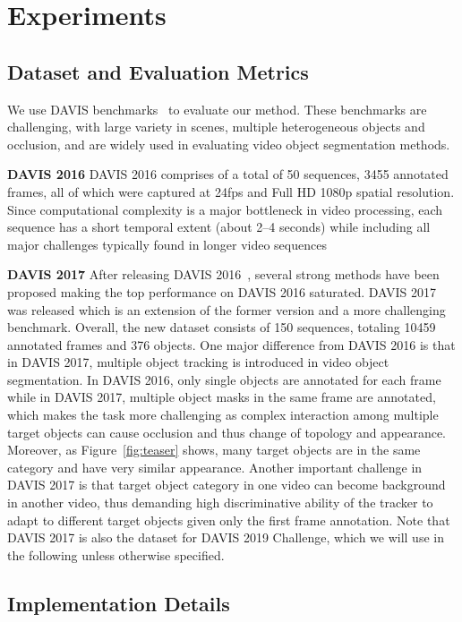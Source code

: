 \documentclass[10pt,twocolumn,letterpaper]{article}
\begin{document}
\section{Experiments}

\subsection{Dataset and Evaluation Metrics}
We use DAVIS benchmarks~\cite{perazzi2016davis, pont2017davis, caelles2018davis} to evaluate our method.
These benchmarks are challenging, with large variety in scenes, multiple heterogeneous objects and occlusion, and are
widely used in evaluating video object segmentation methods.

\textbf{DAVIS 2016}
DAVIS 2016 comprises of a total of 50 sequences, 3455 annotated frames, all of which were captured at 24fps and Full HD 1080p spatial resolution.
Since computational complexity is a major bottleneck in video processing, each sequence has a short temporal extent (about 2--4 seconds) while including all major challenges typically found in longer video sequences

\textbf{DAVIS 2017}
After releasing DAVIS 2016~\cite{perazzi2016davis}, several strong methods have been proposed making the top performance on DAVIS 2016 saturated.
DAVIS 2017 was released which is an extension of the former version and a more challenging benchmark.
Overall, the new dataset consists of 150 sequences, totaling 10459 annotated frames and 376 objects.
One major difference from DAVIS 2016 is that in DAVIS 2017, multiple object tracking is introduced in video object segmentation.
In DAVIS 2016, only single objects are annotated for each frame while
in DAVIS 2017, multiple object masks in the same frame are annotated,
which makes the task more challenging as complex interaction among multiple target objects can cause occlusion and thus change of topology and appearance.  Moreover, as Figure~\ref{fig:teaser} shows, many target objects are in the same category and have very similar appearance.
Another important challenge in DAVIS 2017 is that  target object category in one video can become background in another video, thus demanding high discriminative ability of the tracker to adapt to different target objects given only the first frame annotation.
Note that DAVIS 2017 is also the dataset for DAVIS 2019 Challenge, which we will use in the following unless otherwise specified.



\subsection{Implementation Details}
\end{document}
